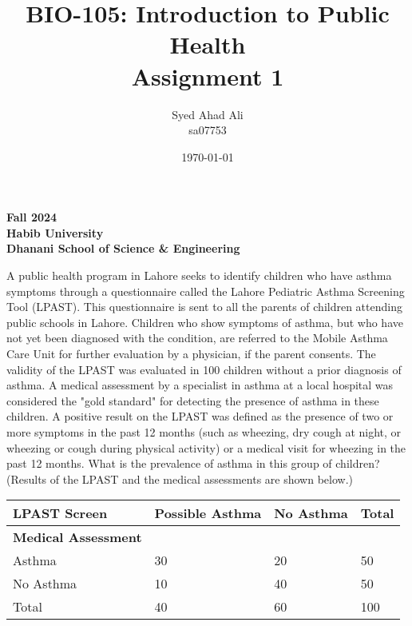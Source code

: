 \documentclass[a4paper]{exam}
\title{BIO-105: Introduction to Public Health\\
Assignment 1}
\author{Syed Ahad Ali\\ sa07753}
\date{\today}
\begin{document}
\maketitle

\begin{center}
    \textbf{Fall 2024}\\
    \textbf{Habib University}\\
    \textbf{Dhanani School of Science \& Engineering}
\end{center}


\begin{questions}

    \question[10]
    A public health program in Lahore seeks to identify children who have asthma symptoms through a questionnaire called the Lahore Pediatric Asthma Screening Tool (LPAST). This questionnaire is sent to all the parents of children attending public schools in Lahore. Children who show symptoms of asthma, but who have not yet been diagnosed with the condition, are referred to the Mobile Asthma Care Unit for further evaluation by a physician, if the parent consents. The validity of the LPAST was evaluated in 100 children without a prior diagnosis of asthma. A medical assessment by a specialist in asthma at a local hospital was considered the "gold standard" for detecting the presence of asthma in these children. A positive result on the LPAST was defined as the presence of two or more symptoms in the past 12 months (such as wheezing, dry cough at night, or wheezing or cough during physical activity) or a medical visit for wheezing in the past 12 months. What is the prevalence of asthma in this group of children? (Results of the LPAST and the medical assessments are shown below.)
    \begin{table}[H]
        \begin{tabular}{|l|l|l|l|}
        \hline
        \textbf{LPAST Screen}       & \textbf{Possible Asthma} & \textbf{No Asthma} & \textbf{Total} \\ \hline
        \textbf{Medical Assessment} &                 &           &       \\ \hline
        Asthma             & 30              & 20        & 50    \\ \hline
        No Asthma          & 10              & 40        & 50    \\ \hline
        Total              & 40              & 60        & 100   \\ \hline
        \end{tabular}
    \end{table}


\end{questions}
\end{document}
